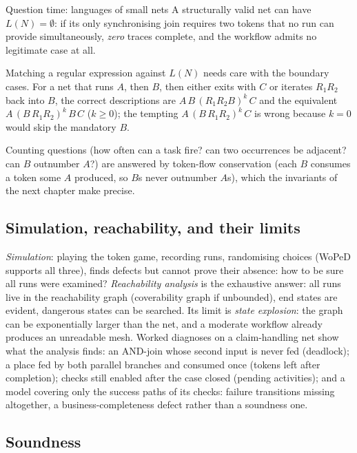 \begin{examplebox}{Question time: languages of small nets}
A structurally valid net can have $L(N) = \emptyset$: if its only synchronising join requires two tokens that no run can provide simultaneously, \emph{zero} traces complete, and the workflow admits no legitimate case at all.

Matching a regular expression against $L(N)$ needs care with the boundary cases. For a net that runs $A$, then $B$, then either exits with $C$ or iterates $R_1 R_2$ back into $B$, the correct descriptions are $A\,B\,(R_1 R_2 B)^k\, C$ and the equivalent $A\,(B\, R_1 R_2)^k\, B\, C$ ($k \geq 0$); the tempting $A\,(B\, R_1 R_2)^k\, C$ is wrong because $k = 0$ would skip the mandatory $B$.

Counting questions (how often can a task fire? can two occurrences be adjacent? can $B$ outnumber $A$?) are answered by token-flow conservation (each $B$ consumes a token some $A$ produced, so $B$s never outnumber $A$s), which the invariants of the next chapter make precise.
\end{examplebox}

\subsection{Simulation, reachability, and their limits}

\emph{Simulation}: playing the token game, recording runs, randomising choices (WoPeD supports all three), finds defects but cannot prove their absence: how to be sure all runs were examined? \emph{Reachability analysis} is the exhaustive answer: all runs live in the reachability graph (coverability graph if unbounded), end states are evident, dangerous states can be searched. Its limit is \emph{state explosion}: the graph can be exponentially larger than the net, and a moderate workflow already produces an unreadable mesh. Worked diagnoses on a claim-handling net show what the analysis finds: an AND-join whose second input is never fed (deadlock); a place fed by both parallel branches and consumed once (tokens left after completion); checks still enabled after the case closed (pending activities); and a model covering only the success paths of its checks: failure transitions missing altogether, a business-completeness defect rather than a soundness one.

\subsection{Soundness}


